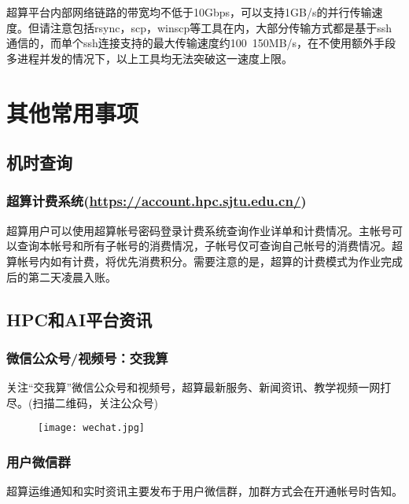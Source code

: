 \documentclass[cn, 12pt, hang, black, chinese]{elegantbook}
\begin{document}
超算平台内部网络链路的带宽均不低于10Gbps，可以支持1GB/s的并行传输速度。但请注意包括rsync，scp，winscp等工具在内，大部分传输方式都是基于ssh通信的，而单个ssh连接支持的最大传输速度约100~150MB/s，在不使用额外手段多进程并发的情况下，以上工具均无法突破这一速度上限。

\chapter{其他常用事项}

\section{机时查询}
\subsection*{超算计费系统(\href{https://account.hpc.sjtu.edu.cn/}{https://account.hpc.sjtu.edu.cn/})}
超算用户可以使用超算帐号密码登录计费系统查询作业详单和计费情况。主帐号可以查询本帐号和所有子帐号的消费情况，子帐号仅可查询自己帐号的消费情况。超算帐号内如有计费，将优先消费积分。需要注意的是，超算的计费模式为作业完成后的第二天凌晨入账。

\section{HPC和AI平台资讯}
\subsection*{微信公众号/视频号：交我算}
关注“交我算”微信公众号和视频号，超算最新服务、新闻资讯、教学视频一网打尽。(扫描二维码，关注公众号)

\begin{figure}[!htb]
\centering
\texttt{[image: wechat.jpg]}
\end{figure}

\subsection*{用户微信群}
超算运维通知和实时资讯主要发布于用户微信群，加群方式会在开通帐号时告知。
\end{document}

